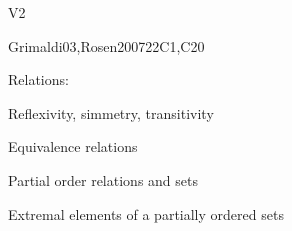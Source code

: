 \begin{syllabus}
\begin{competences}{V2}
    \item {}
    \item {}
\end{competences}

    \begin{unit}{\DSSetsRelationsandFunctions}{}{Grimaldi03,Rosen2007}{22}{C1,C20}
    \begin{topics}
        \item \DSSetsRelationsandFunctionsTopicSets
        \item Relations:
            \begin{subtopics}
                \item Reflexivity, simmetry, transitivity
                \item Equivalence relations
                \item Partial order relations and sets
                \item Extremal elements of a partially ordered sets
            \end{subtopics}
        \item \DSSetsRelationsandFunctionsTopicFunctions
    \end{topics}
    \begin{learningoutcomes}
    \item \DSSetsRelationsandFunctionsLOExplainWith [\Assessment]
    \item \DSSetsRelationsandFunctionsLOPerformThe [\Assessment]
    \item \DSSetsRelationsandFunctionsLORelate [\Assessment]
    \end{learningoutcomes}
    \end{unit}


\end{syllabus}
